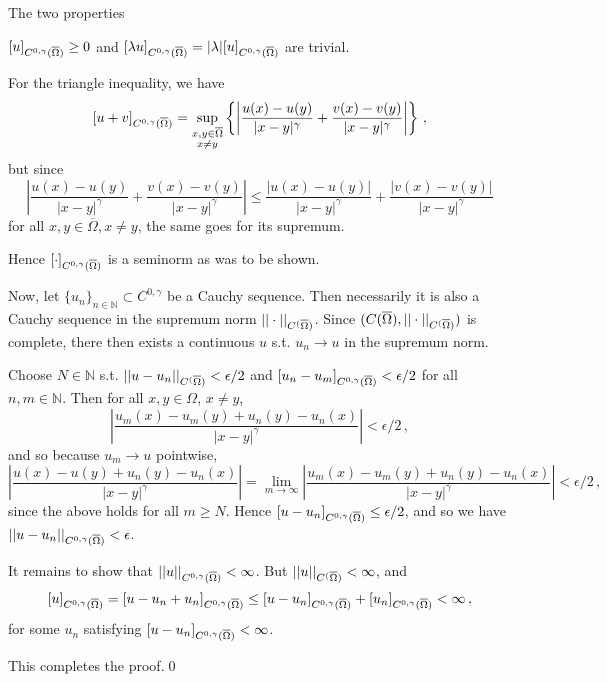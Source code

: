 \documentclass[11pt]{amsart}
\theoremstyle{definition}
\newcommand{\N}{\mathbb{N}}
\numberwithin{equation}{section}
\begin{document}
The two properties

$[u]_{C^{0,\gamma}(\overline{\Omega})} \geq 0$ 
and
$[\lambda u]_{C^{0,\gamma}(\overline{\Omega})} = |\lambda| [u]_{C^{0,\gamma}(\overline{\Omega})}$ are trivial.

For the triangle inequality, we have
\begin{equation}
[u+v]_{C^{0,\gamma}(\overline{\Omega})}
= 
\sup_{
\substack{
x,y\in\overline{\Omega}\\
x\neq y
}
}
\left\{\left|
\frac{u(x) - u(y)}{|x-y|^\gamma}
+
\frac{v(x) - v(y)}{|x-y|^\gamma}
\right|\right\}\,,
\end{equation}
but since 
\begin{equation}
\left|\frac{u(x) - u(y)}{|x-y|^\gamma}
+
\frac{v(x) - v(y)}{|x-y|^\gamma}\right|
\leq
\frac{|u(x) - u(y)|}{|x-y|^\gamma}
+
\frac{|v(x) - v(y)|}{|x-y|^\gamma}
\end{equation}
for all $x,y \in \overline{\Omega}, x\neq y$, the same goes for its supremum.

Hence $[\cdot]_{C^{0,\gamma}(\overline{\Omega})}$ is a seminorm as was to be shown.

Now, let $\{u_n\}_{n\in\N} \subset C^{0,\gamma}$ be a Cauchy sequence. Then necessarily it is also a Cauchy sequence in the supremum norm $||\cdot||_{C^(\overline{\Omega})}$. Since $(C(\overline{\Omega}), ||\cdot||_{C^(\overline{\Omega})})$ is complete, there then exists a continuous $u$ s.t. $u_n \to u$ in the supremum norm.

Choose $N \in \N$ s.t. $||u - u_n||_{C^(\overline{\Omega})} < \epsilon/2$ and $[u_n - u_m]_{C^{0,\gamma}(\overline{\Omega})} < \epsilon/2$ for all $n, m\in \N$. Then for all $x,y \in \Omega$, $x \neq y$,
\begin{equation}
\left|\frac{u_m(x) - u_m(y) + u_n(y) - u_n(x)}{|x-y|^\gamma}
\right| < \epsilon/2\,,
\end{equation}
and so because $u_m \to u$ pointwise,
\begin{equation}
\left|
\frac{u(x) - u(y) + u_n(y) - u_n(x)}{|x-y|^\gamma}
\right|
=
\lim_{m\to\infty}
\left|
\frac{
u_m(x) - u_m(y) + u_n(y) - u_n(x)}{|x-y|^\gamma}
\right| < \epsilon/2\,,
\end{equation}
since the above holds for all $m \geq N$. Hence
 $[u - u_n]_{C^{0,\gamma}(\overline{\Omega})} \leq \epsilon/2$, and so we have $||u - u_n||_{C^{0,\gamma}(\overline{\Omega})} < \epsilon$.
 
It remains to show that $||u||_{C^{0,\gamma}(\overline{\Omega})} < \infty$. But $||u||_{C^(\overline{\Omega})} < \infty$, and
\begin{equation}
[u]_{C^{0,\gamma}(\overline{\Omega})} = [u - u_n + u_n]_{C^{0,\gamma}(\overline{\Omega})}
\leq [u - u_n]_{C^{0,\gamma}(\overline{\Omega})} + [u_n]_{C^{0,\gamma}(\overline{\Omega})} < \infty\,,
\end{equation}
for some $u_n$ satisfying $[u - u_n]_{C^{0,\gamma}(\overline{\Omega})} < \infty$.

This completes the proof.\qed
\end{document}
